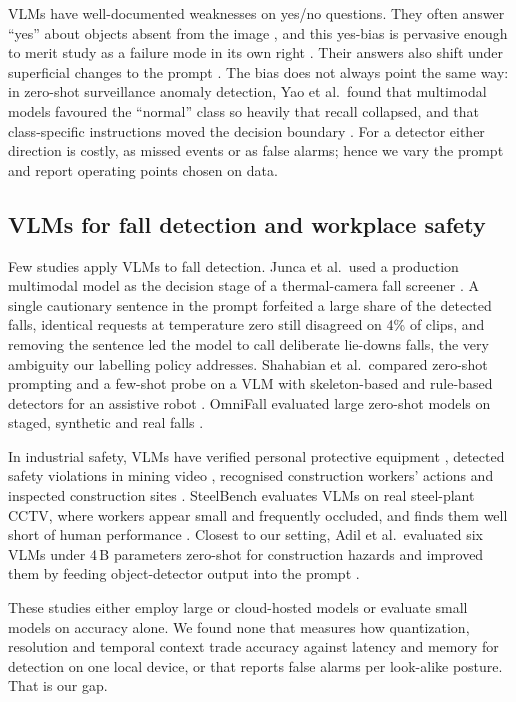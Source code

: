 VLMs have well-documented weaknesses on yes/no questions. They often answer ``yes'' about objects absent from the image \cite{li2023pope}, and this yes-bias is pervasive enough to merit study as a failure mode in its own right \cite{guan2024hallusionbench,chan2026yesbias}. Their answers also shift under superficial changes to the prompt \cite{zong2024permutations}. The bias does not always point the same way: in zero-shot surveillance anomaly detection, Yao et al.\ found that multimodal models favoured the ``normal'' class so heavily that recall collapsed, and that class-specific instructions moved the decision boundary \cite{yao2026surveillance}. For a \pd{} detector either direction is costly, as missed events or as false alarms; hence we vary the prompt and report operating points chosen on data.

\subsection{VLMs for fall detection and workplace safety}
Few studies apply VLMs to fall detection. Junca et al.\ used a production multimodal model as the decision stage of a thermal-camera fall screener \cite{junca2026thermal}. A single cautionary sentence in the prompt forfeited a large share of the detected falls, identical requests at temperature zero still disagreed on 4\% of clips, and removing the sentence led the model to call deliberate lie-downs falls, the very ambiguity our labelling policy addresses. Shahabian et al.\ compared zero-shot prompting and a few-shot probe on a VLM with skeleton-based and rule-based detectors for an assistive robot \cite{shahabian2026vlmfall}. OmniFall evaluated large zero-shot models on staged, synthetic and real falls \cite{schneider2025omnifall}.

In industrial safety, VLMs have verified personal protective equipment \cite{chen2024clip2safety}, detected safety violations in mining video \cite{wu2025monitorvlm}, recognised construction workers' actions \cite{bui2026construction} and inspected construction sites \cite{chen2026constructionsite10k}. SteelBench evaluates VLMs on real steel-plant CCTV, where workers appear small and frequently occluded, and finds them well short of human performance \cite{yarrabothula2026steelbench}. Closest to our setting, Adil et al.\ evaluated six VLMs under 4\,B parameters zero-shot for construction hazards and improved them by feeding object-detector output into the prompt \cite{adil2026svlm}.

These studies either employ large or cloud-hosted models or evaluate small models on accuracy alone. We found none that measures how quantization, resolution and temporal context trade accuracy against latency and memory for \pd{} detection on one local device, or that reports false alarms per look-alike posture. That is our gap.

